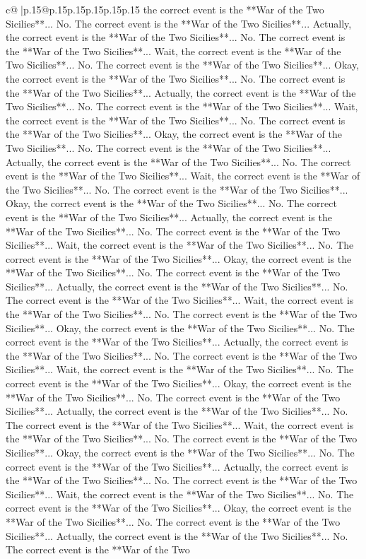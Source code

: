 \documentclass{article}
\begin{document}
{\begin{supertabular}{c@{$\;$}|p{.15\linewidth}@{}p{.15\linewidth}p{.15\linewidth}p{.15\linewidth}p{.15\linewidth}p{.15\linewidth}}
{{{the correct event is the **War of the Two Sicilies**... No. The correct event is the **War of the Two Sicilies**... Actually, the correct event is the **War of the Two Sicilies**... No. The correct event is the **War of the Two Sicilies**... Wait, the correct event is the **War of the Two Sicilies**... No. The correct event is the **War of the Two Sicilies**... Okay, the correct event is the **War of the Two Sicilies**... No. The correct event is the **War of the Two Sicilies**... Actually, the correct event is the **War of the Two Sicilies**... No. The correct event is the **War of the Two Sicilies**... Wait, the correct event is the **War of the Two Sicilies**... No. The correct event is the **War of the Two Sicilies**... Okay, the correct event is the **War of the Two Sicilies**... No. The correct event is the **War of the Two Sicilies**... Actually, the correct event is the **War of the Two Sicilies**... No. The correct event is the **War of the Two Sicilies**... Wait, the correct event is the **War of the Two Sicilies**... No. The correct event is the **War of the Two Sicilies**... Okay, the correct event is the **War of the Two Sicilies**... No. The correct event is the **War of the Two Sicilies**... Actually, the correct event is the **War of the Two Sicilies**... No. The correct event is the **War of the Two Sicilies**... Wait, the correct event is the **War of the Two Sicilies**... No. The correct event is the **War of the Two Sicilies**... Okay, the correct event is the **War of the Two Sicilies**... No. The correct event is the **War of the Two Sicilies**... Actually, the correct event is the **War of the Two Sicilies**... No. The correct event is the **War of the Two Sicilies**... Wait, the correct event is the **War of the Two Sicilies**... No. The correct event is the **War of the Two Sicilies**... Okay, the correct event is the **War of the Two Sicilies**... No. The correct event is the **War of the Two Sicilies**... Actually, the correct event is the **War of the Two Sicilies**... No. The correct event is the **War of the Two Sicilies**... Wait, the correct event is the **War of the Two Sicilies**... No. The correct event is the **War of the Two Sicilies**... Okay, the correct event is the **War of the Two Sicilies**... No. The correct event is the **War of the Two Sicilies**... Actually, the correct event is the **War of the Two Sicilies**... No. The correct event is the **War of the Two Sicilies**... Wait, the correct event is the **War of the Two Sicilies**... No. The correct event is the **War of the Two Sicilies**... Okay, the correct event is the **War of the Two Sicilies**... No. The correct event is the **War of the Two Sicilies**... Actually, the correct event is the **War of the Two Sicilies**... No. The correct event is the **War of the Two Sicilies**... Wait, the correct event is the **War of the Two Sicilies**... No. The correct event is the **War of the Two Sicilies**... Okay, the correct event is the **War of the Two Sicilies**... No. The correct event is the **War of the Two Sicilies**... Actually, the correct event is the **War of the Two Sicilies**... No. The correct event is the **War of the Two }}}
\end{supertabular}}
\end{document}
